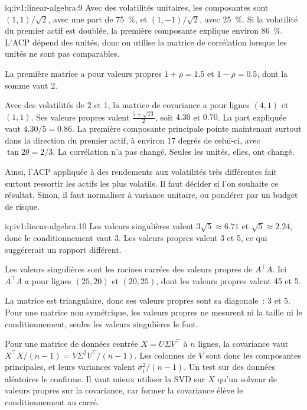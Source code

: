 \begin{solution}{iq:iv1:linear-algebra:9}
Avec des volatilités unitaires, les composantes sont $(1, 1)/\sqrt{2}$, avec une part de 75~\%, et $(1, -1)/\sqrt{2}$, avec 25~\%. Si la volatilité du premier actif est doublée, la première composante explique environ 86~\%. L'ACP dépend des unités, donc on utilise la matrice de corrélation lorsque les unités ne sont pas comparables.

La première matrice a pour valeurs propres $1 + \rho = 1.5$ et $1 - \rho = 0.5$, dont la somme vaut 2.

Avec des volatilités de 2 et 1, la matrice de covariance a pour lignes $(4, 1)$ et $(1, 1)$. Ses valeurs propres valent $\frac{5 \pm \sqrt{13}}{2}$, soit $4.30$ et $0.70$. La part expliquée vaut $4.30/5 = 0.86$. La première composante principale pointe maintenant surtout dans la direction du premier actif, à environ 17 degrés de celui-ci, avec $\tan 2\theta = 2/3$. La corrélation n'a pas changé. Seules les unités, elles, ont changé.

Ainsi, l'ACP appliquée à des rendements aux volatilités très différentes fait surtout ressortir les actifs les plus volatils. Il faut décider si l'on souhaite ce résultat. Sinon, il faut normaliser à variance unitaire, ou pondérer par un budget de risque.

\end{solution}

\begin{solution}{iq:iv1:linear-algebra:10}
Les valeurs singulières valent $3\sqrt{5} \approx 6.71$ et $\sqrt{5} \approx 2.24$, donc le conditionnement vaut 3. Les valeurs propres valent 3 et 5, ce qui suggérerait un rapport différent.

Les valeurs singulières sont les racines carrées des valeurs propres de $A^\top A$. Ici $A^\top A$ a pour lignes $(25, 20)$ et $(20, 25)$, dont les valeurs propres valent 45 et 5.

La matrice est triangulaire, donc ses valeurs propres sont sa diagonale~: 3 et 5. Pour une matrice non symétrique, les valeurs propres ne mesurent ni la taille ni le conditionnement, seules les valeurs singulières le font.

Pour une matrice de données centrée $X = U\Sigma V^\top$ à $n$ lignes, la covariance vaut $X^\top X/(n - 1) = V\Sigma^2V^\top/(n - 1)$. Les colonnes de $V$ sont donc les composantes principales, et leurs variances valent $\sigma_i^2/(n - 1)$. Un test sur des données aléatoires le confirme. Il vaut mieux utiliser la SVD sur $X$ qu'un solveur de valeurs propres sur la covariance, car former la covariance élève le conditionnement au carré.

\end{solution}

